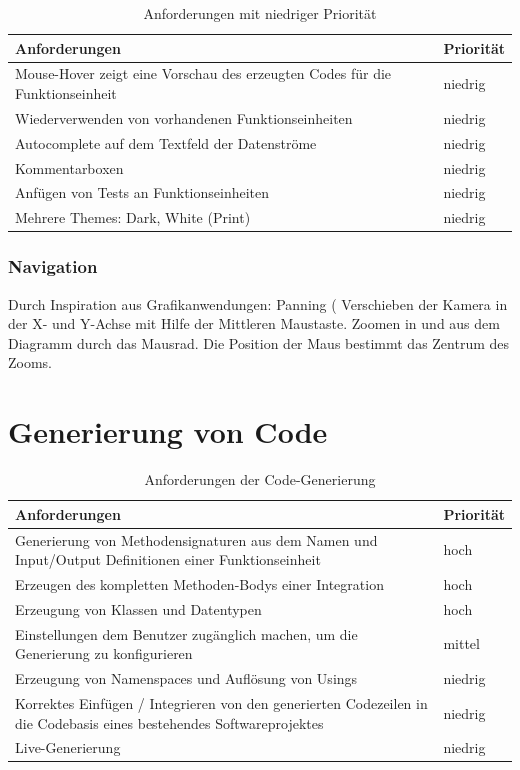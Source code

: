 \begin{table}[H]
\begin{tabularx}{\textwidth}{X|l}

	Anforderungen & Priorität\\
	\hline \hline
Mouse-Hover zeigt eine Vorschau des erzeugten Codes für die Funktionseinheit & niedrig\\ \hline
Wiederverwenden von vorhandenen Funktionseinheiten & niedrig\\ \hline
Autocomplete auf dem Textfeld der Datenströme & niedrig\\ \hline
Kommentarboxen & niedrig\\ \hline
Anfügen von Tests an Funktionseinheiten & niedrig\\ \hline
Mehrere Themes: Dark, White (Print) & niedrig\\ \hline
\end{tabularx}
\caption{Anforderungen mit niedriger Priorität}
\end{table}



\subsubsection{Navigation}

Durch Inspiration aus Grafikanwendungen: Panning ( Verschieben der Kamera in
der X- und Y-Achse mit Hilfe der Mittleren Maustaste. Zoomen in und aus dem
Diagramm durch das Mausrad. Die Position der Maus bestimmt das Zentrum des
Zooms.


\section{Generierung von Code}

\begin{table}[H]
\begin{tabularx}{\textwidth}{X|l}
Anforderungen & Priorität\\
\hline
\hline
Generierung von Methodensignaturen aus dem Namen und Input/Output Definitionen einer Funktionseinheit & hoch\\
\hline
Erzeugen des kompletten Methoden-Bodys einer Integration & hoch\\
\hline
Erzeugung von Klassen und Datentypen & hoch\\
\hline
Einstellungen  dem Benutzer zugänglich machen, um die Generierung zu konfigurieren & mittel\\
\hline
Erzeugung von Namenspaces und Auflösung von Usings & niedrig\\
\hline
Korrektes Einfügen / Integrieren von den generierten Codezeilen in die Codebasis eines bestehendes Softwareprojektes & niedrig\\
\hline
Live-Generierung & niedrig\\
\hline
\end{tabularx}
\caption{Anforderungen der Code-Generierung}
\end{table}


